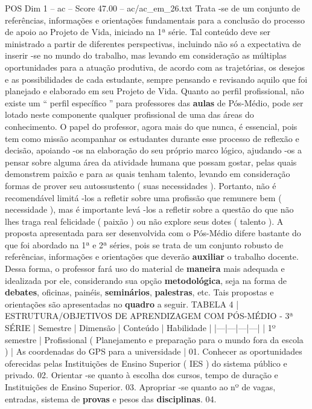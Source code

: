 \begin{textsample}{POS Dim 1 – ac – Score 47.00 – ac/ac\_em\_26.txt}
Trata -se de um conjunto de referências, informações e orientações fundamentais para a conclusão do processo de apoio ao Projeto de Vida, iniciado na 1ª série.
Tal conteúdo deve ser ministrado a partir de diferentes perspectivas, incluindo não só a expectativa de inserir -se no mundo do trabalho, mas levando em consideração as múltiplas oportunidades para a atuação produtiva, de acordo com as trajetórias, os desejos e as possibilidades de cada estudante, sempre pensando e revisando aquilo que foi planejado e elaborado em seu Projeto de Vida.
Quanto ao perfil profissional, não existe um “ perfil específico ” para professores das \textbf{aulas} de Pós-Médio, pode ser lotado neste componente qualquer profissional de uma das áreas do conhecimento.
O papel do professor, agora mais do que nunca, é essencial, pois tem como missão acompanhar os estudantes durante esse processo de reflexão e decisão, apoiando -os na elaboração do seu próprio marco lógico, ajudando -os a pensar sobre alguma área da atividade humana que possam gostar, pelas quais demonstrem paixão e para as quais tenham talento, levando em consideração formas de prover seu autossustento ( suas necessidades ).
Portanto, não é recomendável limitá -los a refletir sobre uma profissão que remunere bem ( necessidade ), mas é importante levá -los a refletir sobre a questão do que não lhes traga real felicidade ( paixão ) ou não explore seus dotes ( talento ).
A proposta apresentada para ser desenvolvida com o Pós-Médio difere bastante do que foi abordado na 1ª e 2ª séries, pois se trata de um conjunto robusto de referências, informações e orientações que deverão \textbf{auxiliar} o trabalho docente.
Dessa forma, o professor fará uso do material de \textbf{maneira} mais adequada e idealizada por ele, considerando sua opção \textbf{metodológica}, seja na forma de \textbf{debates}, oficinas, painéis, \textbf{seminários}, \textbf{palestras}, etc.
Tais propostas e orientações são apresentadas no \textbf{quadro} a seguir.
TABELA 4 | ESTRUTURA/OBJETIVOS DE APRENDIZAGEM COM PÓS-MÉDIO - 3ª SÉRIE | Semestre | Dimensão | Conteúdo | Habilidade | |---|---|---|---| | 1º semestre | Profissional ( Planejamento e preparação para o mundo fora da escola ) | As coordenadas do GPS para a universidade | 01.
Conhecer as oportunidades oferecidas pelas Instituições de Ensino Superior ( IES ) do sistema público e privado. 02.
Orientar -se quanto à escolha dos cursos, tempo de duração e Instituições de Ensino Superior. 03.
Apropriar -se quanto ao nº de vagas, entradas, sistema de \textbf{provas} e pesos das \textbf{disciplinas}. 04.

\end{textsample}
